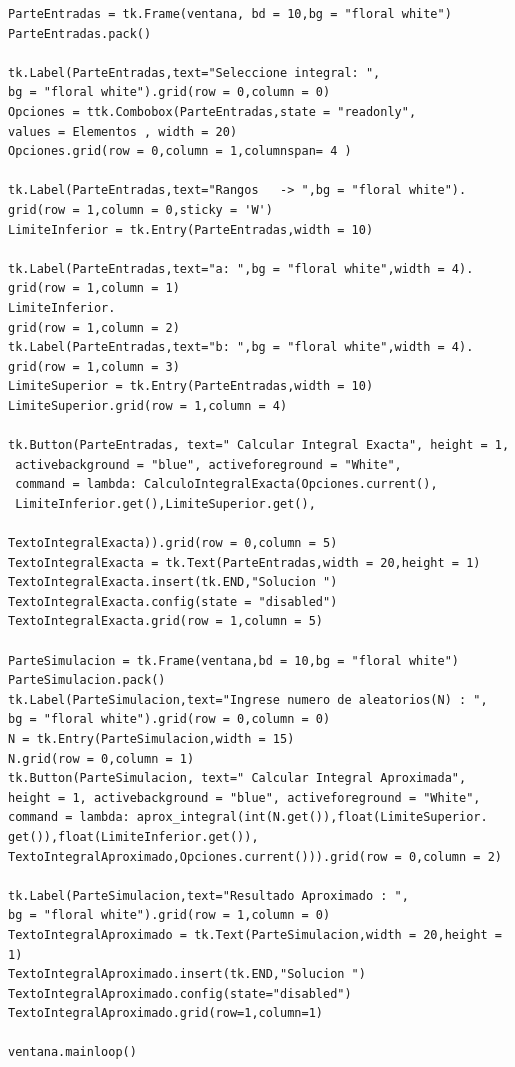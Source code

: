 \documentclass[runningheads,a4paper]{llncs}
\begin{document}
\begin{lstlisting}
ParteEntradas = tk.Frame(ventana, bd = 10,bg = "floral white") 
ParteEntradas.pack()

tk.Label(ParteEntradas,text="Seleccione integral: ",
bg = "floral white").grid(row = 0,column = 0)
Opciones = ttk.Combobox(ParteEntradas,state = "readonly",
values = Elementos , width = 20)
Opciones.grid(row = 0,column = 1,columnspan= 4 )

tk.Label(ParteEntradas,text="Rangos   -> ",bg = "floral white").
grid(row = 1,column = 0,sticky = 'W')
LimiteInferior = tk.Entry(ParteEntradas,width = 10)

tk.Label(ParteEntradas,text="a: ",bg = "floral white",width = 4).
grid(row = 1,column = 1)
LimiteInferior.
grid(row = 1,column = 2)
tk.Label(ParteEntradas,text="b: ",bg = "floral white",width = 4).
grid(row = 1,column = 3)
LimiteSuperior = tk.Entry(ParteEntradas,width = 10)
LimiteSuperior.grid(row = 1,column = 4)

tk.Button(ParteEntradas, text=" Calcular Integral Exacta", height = 1,
 activebackground = "blue", activeforeground = "White",
 command = lambda: CalculoIntegralExacta(Opciones.current(),
 LimiteInferior.get(),LimiteSuperior.get(),
 
TextoIntegralExacta)).grid(row = 0,column = 5)
TextoIntegralExacta = tk.Text(ParteEntradas,width = 20,height = 1)
TextoIntegralExacta.insert(tk.END,"Solucion ")
TextoIntegralExacta.config(state = "disabled")
TextoIntegralExacta.grid(row = 1,column = 5)

ParteSimulacion = tk.Frame(ventana,bd = 10,bg = "floral white")
ParteSimulacion.pack()
tk.Label(ParteSimulacion,text="Ingrese numero de aleatorios(N) : ",
bg = "floral white").grid(row = 0,column = 0)
N = tk.Entry(ParteSimulacion,width = 15)
N.grid(row = 0,column = 1)
tk.Button(ParteSimulacion, text=" Calcular Integral Aproximada", 
height = 1, activebackground = "blue", activeforeground = "White",
command = lambda: aprox_integral(int(N.get()),float(LimiteSuperior.
get()),float(LimiteInferior.get()),
TextoIntegralAproximado,Opciones.current())).grid(row = 0,column = 2)

tk.Label(ParteSimulacion,text="Resultado Aproximado : ",
bg = "floral white").grid(row = 1,column = 0)
TextoIntegralAproximado = tk.Text(ParteSimulacion,width = 20,height = 1)
TextoIntegralAproximado.insert(tk.END,"Solucion ")
TextoIntegralAproximado.config(state="disabled")
TextoIntegralAproximado.grid(row=1,column=1)

ventana.mainloop()

\end{lstlisting}
\end{document}
